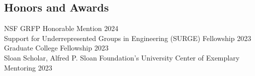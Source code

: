 \documentclass[margin,line]{res}
\newenvironment{list1}{
  \begin{list}{\ding{113}}{%
      \setlength{\itemsep}{0in}
      \setlength{\parsep}{0in} \setlength{\parskip}{0in}
      \setlength{\topsep}{0in} \setlength{\partopsep}{0in} 
      \setlength{\leftmargin}{0.17in}}}{\end{list}}
\begin{document}
\begin{resume}






  \section{\sc Honors and Awards}

  NSF GRFP Honorable Mention \hfill 2024 \\
  Support for Underrepresented Groups in Engineering (SURGE) Fellowship \hfill 2023 \\
  Graduate College Fellowship \hfill 2023 \\
  Sloan Scholar, Alfred P. Sloan Foundation’s University Center of Exemplary Mentoring \hfill 2023 \\


\end{resume}
\end{document}
